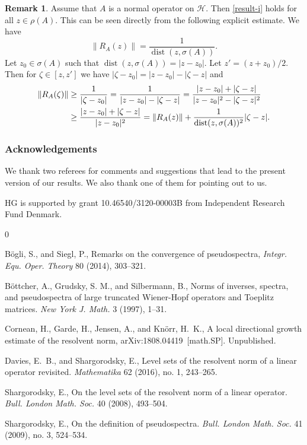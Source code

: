 \documentclass[12pt,a4paper]{article}
\numberwithin{equation}{section}
\theoremstyle{plain}
\theoremstyle{definition}
\newtheorem{remark}[theorem]{Remark}
\newcommand{\abs}[1]{\lvert{#1}\rvert}  %
\newcommand{\norm}[1]{\lVert{#1}\rVert} %
\DeclareMathOperator{\dist}{dist}
\newcommand{\cH}{\mathcal{H}}
\begin{document}
\begin{remark}\label{rem32}
	Assume that $A$ is a normal operator on $\cH$. Then \eqref{result-i}  holds for all $z\in\rho(A)$. This can be seen directly from the following explicit estimate. We have
	\begin{equation*}
		\norm{R_A(z)}=\frac{1}{\dist(z,\sigma(A))}.
	\end{equation*}
	Let $z_0\in\sigma(A)$ such that 
	$\dist(z,\sigma(A))=\abs{z-z_0}$. Let $z'=(z+z_0)/2$. Then for $\zeta\in[z,z']$ we have $|\zeta-z_0|=|z-z_0|-|\zeta-z|$ and
	\begin{align*}
		\norm{R_A(\zeta)} &\geq \frac{1}{\abs{\zeta-z_0}} = \frac{1}{\abs{z-z_0}-\abs{\zeta-z}} = \frac{\abs{z-z_0} + \abs{\zeta-z}}{\abs{z-z_0}^2-\abs{\zeta-z}^2} \notag\\
		&\geq \frac{\abs{z-z_0} + \abs{\zeta-z}}{\abs{z-z_0}^2} = \norm{R_A(z)}+\frac{1}{\dist(z,\sigma(A))^2}\abs{\zeta-z}. 
	\end{align*}
\end{remark}

\subsubsection*{Acknowledgements} 

We thank two referees for comments and suggestions that lead to the present version of our results. We also thank one of them for pointing out \cite{BS} to us.

HG is supported by grant 10.46540/3120-00003B from Independent Research Fund Denmark.

\begin{thebibliography}{0}

\setlength{\itemsep}{-2mm} \footnotesize

 Bögli, S., and Siegl, P., Remarks on the convergence of pseudospectra, \emph{Integr. Equ. Oper. Theory} 80 (2014), 303--321.

 Böttcher, A., Grudsky, S. M., and Silbermann, B., Norms of inverses, spectra, and pseudospectra of large truncated Wiener-Hopf operators and Toeplitz matrices. 
\emph{New York J. Math.} 3 (1997), 1--31.

Cornean, H., Garde, H., Jensen, A., and Knörr, H.~K., A local directional growth estimate of the resolvent norm, arXiv:1808.04419~[math.SP]. Unpublished.

 Davies, E.~B., and Shargorodsky, E., 
{Level sets of the resolvent norm of a linear operator revisited}. 
\emph{Mathematika} 62 (2016), no. 1, 243--265.

Shargorodsky, E.,
{On the level sets of the resolvent norm of a linear operator}.
\emph{Bull. London Math. Soc.} 40 (2008), 493--504.

Shargorodsky, E.,
{On the definition of pseudospectra}. 
\emph{Bull. London Math. Soc.} 41 (2009), no. 3, 524--534.

\end{thebibliography}
\end{document}
